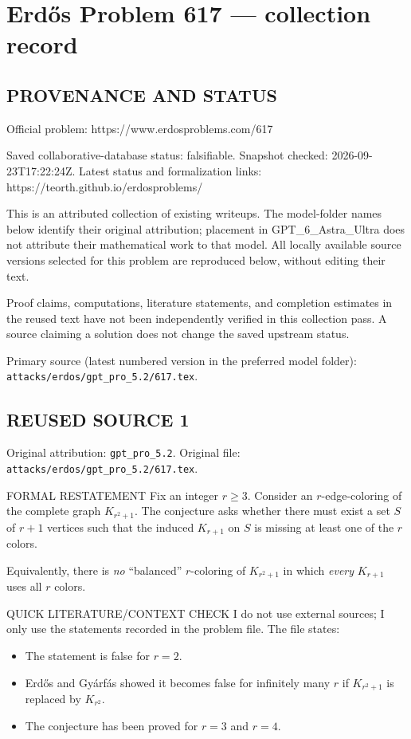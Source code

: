 \section*{Erd\H{o}s Problem 617 --- collection record}

\subsection*{PROVENANCE AND STATUS}
Official problem: https://www.erdosproblems.com/617

Saved collaborative-database status: falsifiable.
Snapshot checked: 2026-09-23T17:22:24Z.
Latest status and formalization links: https://teorth.github.io/erdosproblems/

This is an attributed collection of existing writeups. The model-folder names below identify their original attribution; placement in GPT\_6\_Astra\_Ultra does not attribute their mathematical work to that model. All locally available source versions selected for this problem are reproduced below, without editing their text.

Proof claims, computations, literature statements, and completion estimates in the reused text have not been independently verified in this collection pass. A source claiming a solution does not change the saved upstream status.

Primary source (latest numbered version in the preferred model folder): \texttt{attacks/erdos/gpt\_pro\_5.2/617.tex}.

\subsection*{REUSED SOURCE 1}
Original attribution: \texttt{gpt\_pro\_5.2}.
Original file: \texttt{attacks/erdos/gpt\_pro\_5.2/617.tex}.


FORMAL RESTATEMENT
Fix an integer $r\ge3$. Consider an $r$-edge-coloring of the complete graph
$K_{r^2+1}$.
The conjecture asks whether there must exist a set $S$ of $r+1$ vertices such
that the induced $K_{r+1}$ on $S$ is missing at least one of the $r$ colors.

Equivalently, there is \emph{no} ``balanced'' $r$-coloring of $K_{r^2+1}$ in which
\emph{every} $K_{r+1}$ uses all $r$ colors.

QUICK LITERATURE/CONTEXT CHECK
I do not use external sources; I only use the statements recorded in the problem
file.
The file states:
\begin{itemize}
\item The statement is false for $r=2$.
\item Erd\H{o}s and Gy\'arf\'as showed it becomes false for infinitely many $r$ if
$K_{r^2+1}$ is replaced by $K_{r^2}$.
\item The conjecture has been proved for $r=3$ and $r=4$.
\end{itemize}

